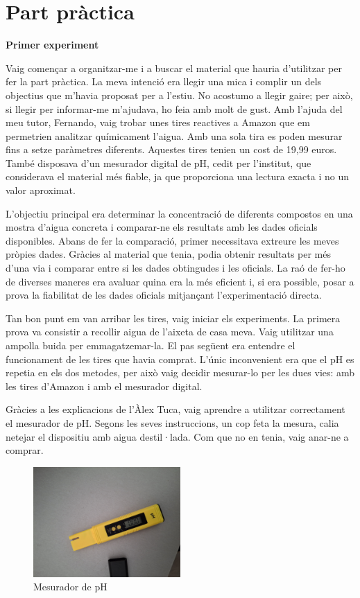 \chapter{Part pràctica}

{\Large \textbf{Primer experiment}}
\newline

Vaig començar a organitzar-me i a buscar el material que hauria d’utilitzar per fer la part pràctica. La meva intenció era llegir una mica i complir un dels objectius que m’havia proposat per a l’estiu. No acostumo a llegir gaire; per això, si llegir per informar-me m’ajudava, ho feia amb molt de gust. Amb l’ajuda del meu tutor, Fernando, vaig trobar unes tires reactives a Amazon que em permetrien analitzar químicament l’aigua. Amb una sola tira es poden mesurar fins a setze paràmetres diferents. Aquestes tires tenien un cost de 19,99 euros. També disposava d’un mesurador digital de pH, cedit per l’institut, que considerava el material més fiable, ja que proporciona una lectura exacta i no un valor aproximat.

L’objectiu principal era determinar la concentració de diferents compostos en una mostra d’aigua concreta i comparar-ne els resultats amb les dades oficials disponibles. Abans de fer la comparació, primer necessitava extreure les meves pròpies dades. Gràcies al material que tenia, podia obtenir resultats per més d’una via i comparar entre si les dades obtingudes i les oficials. La raó de fer-ho de diverses maneres era avaluar quina era la més eficient i, si era possible, posar a prova la fiabilitat de les dades oficials mitjançant l’experimentació directa.

Tan bon punt em van arribar les tires, vaig iniciar els experiments. La primera prova va consistir a recollir aigua de l’aixeta de casa meva. Vaig utilitzar una ampolla buida per emmagatzemar-la. El pas següent era entendre el funcionament de les tires que havia comprat. L’únic inconvenient era que el pH es repetia en els dos metodes, per això vaig decidir mesurar-lo per les dues vies: amb les tires d’Amazon i amb el mesurador digital.

Gràcies a les explicacions de l’Àlex Tuca, vaig aprendre a utilitzar correctament el mesurador de pH. Segons les seves instruccions, un cop feta la mesura, calia netejar el dispositiu amb aigua destil·lada. Com que no en tenia, vaig anar-ne a comprar.
\begin{figure}[H]
\centering
\includegraphics[width=0.5\textwidth]{./Figures/mesurador.png}
\caption{Mesurador de pH}
\label{fig:foto}
\end{figure}

